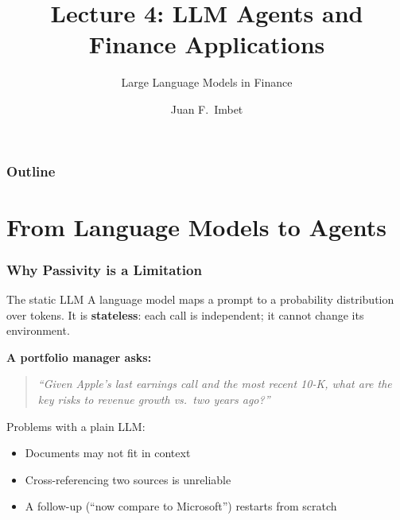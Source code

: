 \documentclass[9pt,t]{beamer}
\title{Lecture 4: LLM Agents and Finance Applications}
\subtitle{Large Language Models in Finance}
\author{Juan F.\ Imbet}
\institute{Paris Dauphine -- PSL University}
\date{}
\begin{document}
\begin{frame}
\frametitle{}
\titlepage
\end{frame}

\begin{frame}
\frametitle{Outline}
\tableofcontents
\end{frame}

\section{From Language Models to Agents}

\begin{frame}
\frametitle{Why Passivity is a Limitation}

\begin{block}{The static LLM}
  A language model maps a prompt to a probability distribution over tokens.
  It is \textbf{stateless}: each call is independent; it cannot change its environment.
\end{block}

\medskip
\textbf{A portfolio manager asks:}
\begin{quote}
\textit{``Given Apple's last earnings call and the most recent 10-K, what are the key
risks to revenue growth vs.\ two years ago?''}
\end{quote}

Problems with a plain LLM:
\begin{itemize}
  \item Documents may not fit in context
  \item Cross-referencing two sources is unreliable
  \item A follow-up (``now compare to Microsoft'') restarts from scratch
\end{itemize}
\end{frame}
\end{document}
